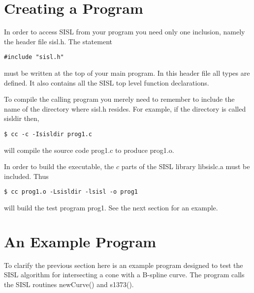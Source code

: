 \vfill
\newpage
\section{Creating a Program}

In order to access SISL from your program you need only one inclusion, namely
the header file sisl.h. The statement
\begin{verbatim}
#include "sisl.h"
\end{verbatim}
must be written at the top of your main program.
In this header file all types
are defined.
It also contains all the
SISL top level function declarations.


To compile the calling program you merely need to remember to include
the name of the directory where sisl.h resides.
For example, if the directory is called sisldir then,
\begin{verbatim}
$ cc -c -Isisldir prog1.c
\end{verbatim}
will compile the source code prog1.c to produce prog1.o.

In order to build the executable, the $c$ parts of the
SISL library libsislc.a must be included. Thus
\begin{verbatim}
$ cc prog1.o -Lsisldir -lsisl -o prog1
\end{verbatim}
will build the test program prog1. See the next section for an example.

\newpage
\section{An Example Program}

To clarify the previous section here is an example program designed to
test the SISL algorithm for intersecting a cone with
a B-spline curve. The program calls the SISL routines newCurve() and s1373().

